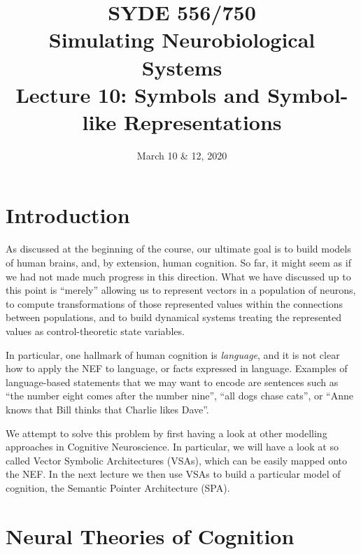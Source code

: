 \documentclass[10pt,letterpaper,oneside]{article}
\date{March 10 \& 12, 2020}
\title{SYDE 556/750 \\ Simulating Neurobiological Systems \\ Lecture 10: Symbols and Symbol-like Representations}
\begin{document}

\section{Introduction}


As discussed at the beginning of the course, our ultimate goal is to build models of human brains, and, by extension, human cognition. So far, it might seem as if we had not made much progress in this direction. What we have discussed up to this point is \enquote{merely} allowing us to represent vectors in a population of neurons, to compute transformations of those represented values within the connections between populations, and to build dynamical systems treating the represented values as control-theoretic state variables.

In particular, one hallmark of human cognition is \emph{language}, and it is not clear how to apply the NEF to language, or facts expressed in language. Examples of language-based statements that we may want to encode are sentences such as \enquote{the number eight comes after the number nine}, \enquote{all dogs chase cats}, or \enquote{Anne knows that Bill thinks that Charlie likes Dave}.

We attempt to solve this problem by first having a look at other modelling approaches in Cognitive Neuroscience. In particular, we will have a look at so called Vector Symbolic Architectures (VSAs), which can be easily mapped onto the NEF. In the next lecture we then use VSAs to build a particular model of cognition, the Semantic Pointer Architecture (SPA).

\section{Neural Theories of Cognition}

\end{document}
